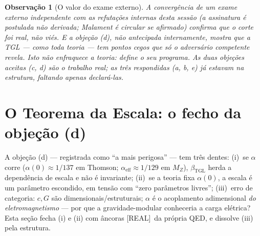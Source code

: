 \documentclass[11pt,a4paper]{article}
\newcommand{\REAL}{\textsf{[REAL]}}
\newcommand{\bTGL}{\beta_{\mathrm{TGL}}}
\newtheorem{remark}{Observação}
\begin{document}
\begin{remark}[O valor do exame externo]
A convergência de um exame externo independente com as refutações internas
desta sessão (a assinatura é postulada não derivada; Malament é circular se
afirmado) confirma que o corte foi real, não viés. E a objeção (d), não
antecipada internamente, mostra que a TGL --- como toda teoria --- tem
pontos cegos que só o adversário competente revela. Isto não enfraquece a
teoria: define o seu programa. As duas objeções aceitas (c, d) são o trabalho
real; as três respondidas (a, b, e) já estavam na estrutura, faltando apenas
declará-las.
\end{remark}

\section{O Teorema da Escala: o fecho da objeção (d)}\label{sec:escala}
A objeção (d) --- registrada como ``a mais perigosa'' --- tem três dentes:
(i)~se $\alpha$ corre ($\alpha(0)\approx1/137$ em Thomson;
$\alpha_{\mathrm{eff}}\approx1/129$ em $M_Z$), $\bTGL$ herda a dependência
de escala e não é invariante; (ii)~se a teoria fixa $\alpha(0)$, a escala
é um parâmetro escondido, em tensão com ``zero parâmetros livres'';
(iii)~erro de categoria: $c,G$ são dimensionais/estruturais; $\alpha$ é o
acoplamento adimensional \emph{do eletromagnetismo} --- por que a
gravidade-modular conheceria a carga elétrica? Esta seção fecha (i) e
(ii) com âncoras \REAL\ da própria QED, e dissolve (iii) pela estrutura.
\end{document}
